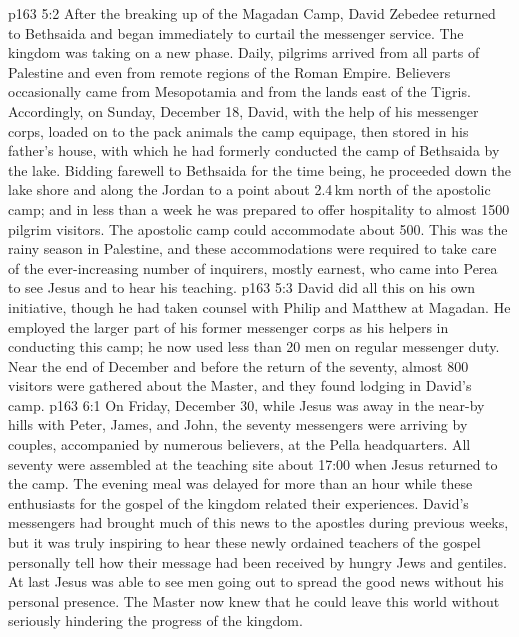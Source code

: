 \vs p163 5:2 After the breaking up of the Magadan Camp, David Zebedee returned to Bethsaida and began immediately to curtail the messenger service. The kingdom was taking on a new phase. Daily, pilgrims arrived from all parts of Palestine and even from remote regions of the Roman Empire. Believers occasionally came from Mesopotamia and from the lands east of the Tigris. Accordingly, on Sunday, December 18, David, with the help of his messenger corps, loaded on to the pack animals the camp equipage, then stored in his father’s house, with which he had formerly conducted the camp of Bethsaida by the lake. Bidding farewell to Bethsaida for the time being, he proceeded down the lake shore and along the Jordan to a point about 2.4\,km north of the apostolic camp; and in less than a week he was prepared to offer hospitality to almost 1500 pilgrim visitors. The apostolic camp could accommodate about 500. This was the rainy season in Palestine, and these accommodations were required to take care of the ever\hyp{}increasing number of inquirers, mostly earnest, who came into Perea to see Jesus and to hear his teaching.
\vs p163 5:3 David did all this on his own initiative, though he had taken counsel with Philip and Matthew at Magadan. He employed the larger part of his former messenger corps as his helpers in conducting this camp; he now used less than 20 men on regular messenger duty. Near the end of December and before the return of the seventy, almost 800 visitors were gathered about the Master, and they found lodging in David’s camp.
\vs p163 6:1 On Friday, December 30, while Jesus was away in the near-by hills with Peter, James, and John, the seventy messengers were arriving by couples, accompanied by numerous believers, at the Pella headquarters. All seventy were assembled at the teaching site about 17:00 when Jesus returned to the camp. The evening meal was delayed for more than an hour while these enthusiasts for the gospel of the kingdom related their experiences. David’s messengers had brought much of this news to the apostles during previous weeks, but it was truly inspiring to hear these newly ordained teachers of the gospel personally tell how their message had been received by hungry Jews and gentiles. At last Jesus was able to see men going out to spread the good news without his personal presence. The Master now knew that he could leave this world without seriously hindering the progress of the kingdom.
